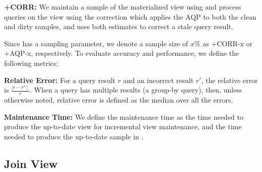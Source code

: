 \noindent\textbf{\svcnospace+CORR: } We maintain a sample of the materialized view using \svc and process queries on the view using the correction which applies the AQP to both the clean and dirty samples, and uses both estimates to correct a stale query result.

\vspace{0.5em}
Since \svc has a sampling parameter, we denote a sample size of $x \% $ as \svcnospace+CORR-x or \svcnospace+AQP-x, respectively. 
To evaluate accuracy and performance, we define the following metrics:

\noindent\textbf{Relative Error: } For a query result $r$ and an incorrect result $r'$, the relative error is $\frac{\mid r-r' \mid}{r}.$
When a query has multiple results (a group-by query), then, unless otherwise noted, relative error is defined as the median over all the errors.

\noindent\textbf{Maintenance Time: } We define the maintenance time as the time needed to produce the up-to-date view for incremental view maintenance, and the time needed to produce the up-to-date sample in \svc. 

\subsection{Join View}

